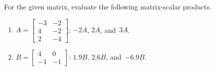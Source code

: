 \begin{exercise}  
For the given matrix, evaluate the following matrix-scalar products.
\begin{enumerate}
\item \(A=\begin{bmatrix} -3&-2
\\4&-2
\\2&-4 \end{bmatrix}\):
\(-2A\), \(2A\), and~\(3A\).


\item \(B=\begin{bmatrix} 4&0
\\-1&-1 \end{bmatrix}\):
\(1.9B\), \(2.6B\), and~\(-6.9B\).



\end{enumerate}
\end{exercise}
